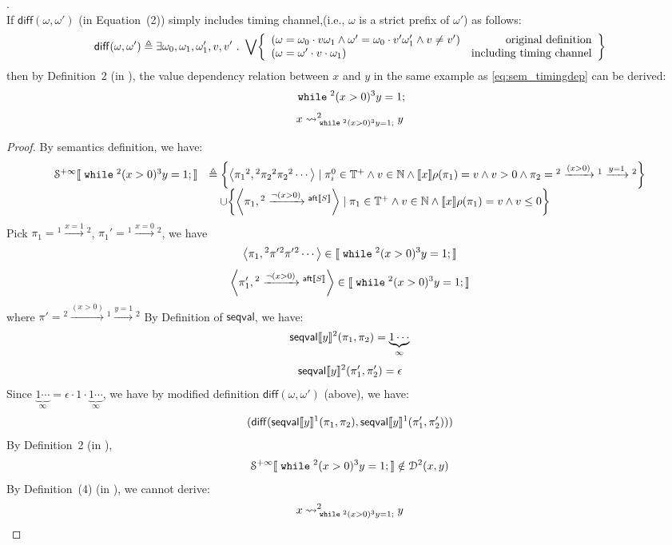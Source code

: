  \begin{example}.
 \label{ex:overapp}
 \\
 If $\mathsf{diff}(\omega, \omega')$ (in \cite{cousot2019abstract} Equation~(2)) simply includes timing channel,(i.e., $\omega$ is a strict prefix of $\omega'$) as follows:
 \[
 	\mathsf{diff}(\omega, \omega') \triangleq \exists \omega_0, \omega_1, \omega_1', v, v' 
 	\st \bigvee \left\{
 	\begin{array}{lr}
 	(\omega = \omega_0 \cdot v \omega_1
 		\land \omega' = \omega_0 \cdot v' \omega_1' \land v \neq v') & \mbox{original definition} \\
 	(\omega = \omega' \cdot v \cdot \omega_1) & \mbox{including timing channel} \\
 	\end{array}
 	\right\}
 \] 
 then by Definition~2 (in \cite{cousot2019abstract}), the value dependency relation between $x$ and $y$ in the same example as \ref{eq:sem_timingdep} can be derived:
 \[
 	\;\mathtt{while}\; {}^2 (x > 0) {}^3 y = 1; 
 \]
  \[
 	x \rightsquigarrow^{2}_{\;\mathtt{while}\; {}^2 (x > 0) {}^3 y = 1;} y
 \]
 \begin{proof}
 By semantics definition, we have:
 \begin{equation}
 \label{eq:sem_timingoverapp}
 \begin{array}{ll}
   \mathcal{S}^{+\infty}\sem{ \ewhile {}^2 (x > 0) {}^3 y = 1; } 
 & \triangleq  
 \left\{ \left< \pi_1{}^2, {}^2 \pi_2 {}^2 \pi_2 {}^2\cdots \right>
 \mid \pi_i^0 \in \mathbb{T^{+}} \land v \in \mathbb{N} \land
 \sem{x}\env(\pi_1) = v
 \land v > 0  \land
 \pi_2 = {}^2 \xrightarrow{(x > 0)} {}^1 \xrightarrow{y = 1} {}^2
 \right\}
 \\ & \quad \cup 
 \left\{ \left< \pi_1, {}^2 \xrightarrow{\neg(x > 0)} {}^{\mathsf{aft}\sem{S}} \right> 
 \mid \pi_1 \in \mathbb{T^{+}} \land v \in \mathbb{N} \land
  \sem{x}\env(\pi_1) = v
 \land v \leq 0 \right\}
 \end{array}
 \end{equation}
 Pick $\pi_1 =  {}^1 \xrightarrow{x = 1} {}^2$, 
 $\pi_1' =  {}^1 \xrightarrow{x = 0} {}^2$, we have
 \[
 	\left< \pi_1, {}^2 \pi' {}^2 \pi' {}^2 \cdots \right> \in \sem{\ewhile {}^2 (x > 0) {}^3 y = 1;}
 \]
 \[
 	\left< \pi_1', {}^2 \xrightarrow{\neg(x > 0)} {}^{\mathsf{aft}\sem{S}}\right> \in \sem{\ewhile {}^2 (x > 0) {}^3 y = 1; }
 \]
 where $\pi' = {}^2 \xrightarrow{(x > 0)} {}^1 \xrightarrow{y = 1} {}^2$
By Definition of $\mathsf{seqval}$, we have:
 \[
  \mathsf{seqval}\llbracket y \rrbracket{}^2(\pi_1, \pi_2 ) = \underbrace{1 \cdots}_{\infty}
 \]
 \[
  \mathsf{seqval}\llbracket y \rrbracket{}^2(\pi'_1, \pi_2' ) = \epsilon
 \]
 Since $\underbrace{1 \cdots}_{\infty} = \epsilon \cdot 1 \cdot \underbrace{1 \cdots}_{\infty}$,
 we have by modified definition $\mathsf{diff}(\omega, \omega')$ (above), we have:
 \[
  (\mathsf{diff}(\mathsf{seqval}\llbracket y \rrbracket{}^1(\pi_1, \pi_2 ), \mathsf{seqval}\llbracket y \rrbracket{}^1(\pi_1', \pi_2' )))
 \]
  By Definition~2 (in \cite{cousot2019abstract}), 
 \[
  \mathcal{S}^{+\infty}\llbracket \;\mathtt{while}\; {}^2 (x > 0) {}^3 y = 1; \rrbracket 
 \notin \mathcal{D}^2(x, y)
 \]
 By Definition~(4) (in \cite{cousot2019abstract}), we cannot derive:
 \[
  x \rightsquigarrow^{2}_{\;\mathtt{while}\; {}^2 (x > 0) {}^3 y = 1;} y
 \]


\end{proof}
\end{example}
